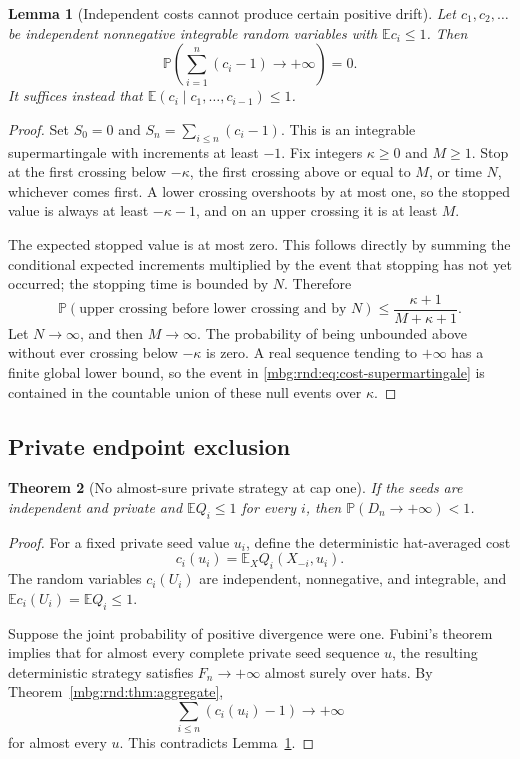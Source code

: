 \documentclass[11pt,letterpaper]{article}
\newtheorem{theorem}{Theorem}[section]
\newtheorem{lemma}[theorem]{Lemma}
\theoremstyle{definition}
\newcommand{\E}{\mathbb E}
\newcommand{\Prb}{\mathbb P}
\begin{document}
\begin{lemma}[Independent costs cannot produce certain positive drift]
\label{mbg:rnd:lem:supermartingale}
Let $c_1,c_2,\ldots$ be independent nonnegative integrable random
variables with $\E c_i\le1$. Then
\begin{equation}
 \Prb\left(\sum_{i=1}^n(c_i-1)\longrightarrow+\infty\right)=0.
 \label{mbg:rnd:eq:cost-supermartingale}
\end{equation}
It suffices instead that
$\E(c_i\mid c_1,\ldots,c_{i-1})\le1$.
\end{lemma}
\begin{proof}
Set $S_0=0$ and $S_n=\sum_{i\le n}(c_i-1)$. This is an integrable
supermartingale with increments at least $-1$. Fix integers $\kappa\ge0$
and $M\ge1$. Stop at the first crossing below $-\kappa$, the first crossing
above or equal to $M$, or time $N$, whichever comes first. A lower
crossing overshoots by at most one, so the stopped value is always at
least $-\kappa-1$, and on an upper crossing it is at least $M$.

The expected stopped value is at most zero. This follows directly by
summing the conditional expected increments multiplied by the event
that stopping has not yet occurred; the stopping time is bounded by
$N$. Therefore
\[
 \Prb(\text{upper crossing before lower crossing and by }N)
 \le\frac{\kappa+1}{M+\kappa+1}.
\]
Let $N\to\infty$, and then $M\to\infty$. The probability of being
unbounded above without ever crossing below $-\kappa$ is zero. A real
sequence tending to $+\infty$ has a finite global lower bound, so the
event in \eqref{mbg:rnd:eq:cost-supermartingale} is contained in the countable
union of these null events over $\kappa$.
\end{proof}

\subsection{Private endpoint exclusion}

\begin{theorem}[No almost-sure private strategy at cap one]
\label{mbg:rnd:thm:private-no-one}
If the seeds are independent and private and $\E Q_i\le1$ for every
$i$, then $\Prb(D_n\to+\infty)<1$.
\end{theorem}
\begin{proof}
For a fixed private seed value $u_i$, define the deterministic
hat-averaged cost
\[
 c_i(u_i)=\E_X Q_i(X_{-i},u_i).
\]
The random variables $c_i(U_i)$ are independent, nonnegative, and
integrable, and $\E c_i(U_i)=\E Q_i\le1$.

Suppose the joint probability of positive divergence were one.
Fubini's theorem implies that for almost every complete private seed
sequence $u$, the resulting deterministic strategy satisfies
$F_n\to+\infty$ almost surely over hats. By Theorem~\ref{mbg:rnd:thm:aggregate},
\[
 \sum_{i\le n}(c_i(u_i)-1)\longrightarrow+\infty
\]
for almost every $u$. This contradicts Lemma~\ref{mbg:rnd:lem:supermartingale}.
\end{proof}
\end{document}
